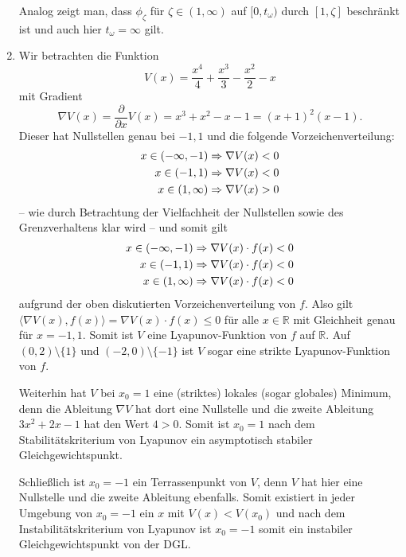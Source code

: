 \documentclass[a4paper]{article}
\begin{document}
\begin{enumerate}
    Analog zeigt man, dass $\phi_\zeta$ für $\zeta \in (1, \infty)$ auf $[0, t_\omega)$ durch $[1, \zeta]$ beschränkt ist und auch hier $t_\omega = \infty$ gilt.

    \item Wir betrachten die Funktion
    \begin{equation*}
        V(x) = \frac{x^4}{4} + \frac{x^3}{3} - \frac{x^2}{2} - x 
    \end{equation*}
    mit Gradient
    \begin{equation*}
        \nabla V(x) = \frac{\partial}{\partial x} V(x) = x^3 + x^2 - x -1 = (x+1)^2(x-1) \text{.}
    \end{equation*}
    Dieser hat Nullstellen genau bei $-1, 1$ und die folgende Vorzeichenverteilung:
    \begin{align*}
        x \in (-\infty, -1) &\Rightarrow \nabla V(x) < 0 \\
        x \in (-1, 1) &\Rightarrow \nabla V(x) < 0 \\
        x \in (1, \infty) &\Rightarrow \nabla V(x) > 0
    \end{align*}
    -- wie durch Betrachtung der Vielfachheit der Nullstellen sowie des Grenzverhaltens klar wird -- und somit gilt 
    \begin{align*}
        x \in (-\infty, -1) &\Rightarrow \nabla V(x) \cdot f(x) < 0 \\
        x \in (-1, 1) &\Rightarrow \nabla V(x) \cdot f(x) < 0 \\
        x \in (1, \infty) &\Rightarrow \nabla V(x) \cdot f(x) < 0
    \end{align*}
    aufgrund der oben diskutierten Vorzeichenverteilung von $f$.
    Also gilt $\langle \nabla V(x), f(x)\rangle = \nabla V(x) \cdot f(x) \leq 0$ für alle $x \in \mathds{R}$ mit Gleichheit genau für $x = -1,1$. 
    Somit ist $V$ eine Lyapunov-Funktion von $f$ auf $\mathds{R}$.
    Auf $(0,2) \setminus \{1\}$ und $(-2, 0) \setminus \{-1\}$ ist $V$ sogar eine strikte Lyapunov-Funktion von $f$.

    Weiterhin hat $V$ bei $x_0 = 1$ eine (striktes) lokales (sogar globales) Minimum, denn die Ableitung $\nabla V$ hat dort eine Nullstelle und die zweite Ableitung $3x^2 + 2x - 1$ hat den Wert $4 > 0$.
    Somit ist $x_0 = 1$ nach dem Stabilitätskriterium von Lyapunov ein asymptotisch stabiler Gleichgewichtspunkt.

    Schließlich ist $x_0 = -1$ ein Terrassenpunkt von $V$, denn $V$ hat hier eine Nullstelle und die zweite Ableitung ebenfalls.
    Somit existiert in jeder Umgebung von $x_0 = -1$ ein $x$ mit $V(x) < V(x_0)$ und nach dem Instabilitätskriterium von Lyapunov ist $x_0 = -1$ somit ein instabiler Gleichgewichtspunkt von der DGL.
\end{enumerate}
\end{document}
